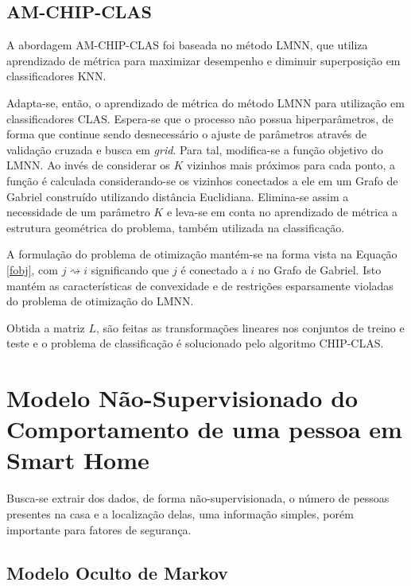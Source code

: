 \documentclass[
	12pt,				%
	openright,			%
	twoside,			%
	a4paper,			%
	english,			%
	spanish,			%
	brazil,				%
	]{abntex2}\usepackage[]{graphicx}\usepackage[]{color}
\begin{document}
\subsection{AM-CHIP-CLAS}

A abordagem AM-CHIP-CLAS foi baseada no método LMNN, que utiliza aprendizado de métrica para maximizar desempenho e diminuir superposição em classificadores KNN.

Adapta-se, então, o aprendizado de métrica do método LMNN para utilização em classificadores CLAS. Espera-se que o processo não possua hiperparâmetros, de forma que continue sendo desnecessário o ajuste de parâmetros através de validação cruzada e busca em \textit{grid}. Para tal, modifica-se a função objetivo do LMNN. Ao invés de considerar os $K$ vizinhos mais próximos para cada ponto, a função é calculada considerando-se os vizinhos conectados a ele em um Grafo de Gabriel construído utilizando distância Euclidiana. Elimina-se assim a necessidade de um parâmetro $K$ e leva-se em conta no aprendizado de métrica a estrutura geométrica do problema, também utilizada na classificação.

A formulação do problema de otimização mantém-se na forma vista na Equação \ref{fobj}, com $j \rightsquigarrow i$ significando que $j$ é conectado a $i$ no Grafo de Gabriel. Isto mantém as características de convexidade e de restrições esparsamente violadas do problema de otimização do LMNN.
\par Obtida a matriz $L$, são feitas as transformações lineares nos conjuntos de treino e teste e o problema de classificação é solucionado pelo algoritmo CHIP-CLAS.



\section{Modelo Não-Supervisionado do Comportamento de uma pessoa em Smart Home}

Busca-se extrair dos dados, de forma não-supervisionada, o número de pessoas presentes na casa e a localização delas, uma informação simples, porém importante para fatores de segurança.


\subsection{Modelo Oculto de Markov}
\end{document}

